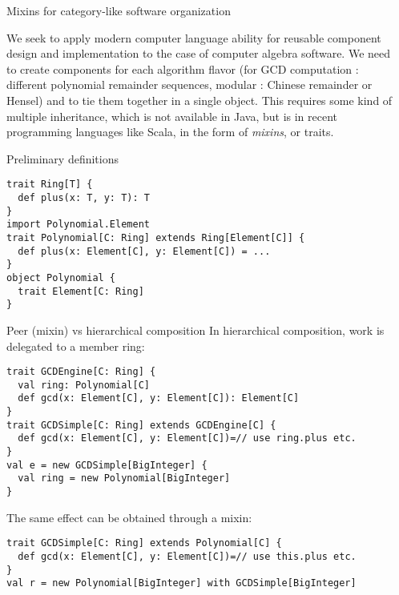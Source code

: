 \documentclass[final]{beamer}
\begin{document}
\begin{frame}[fragile]
\begin{columns}[t]
\begin{column}{.3\linewidth}
\end{column}

\begin{column}{.3\linewidth}
 
  \begin{block}{\large Mixins for category-like software organization}
{\footnotesize 
We seek to apply modern computer language ability for reusable
component design and implementation to the case of computer algebra
software. We need to create components for each algorithm flavor
(for GCD computation : different polynomial remainder sequences,
modular : Chinese remainder or Hensel) and to tie them together
in a single object. This requires some kind of multiple inheritance,
which is not available in Java, but is in recent programming
languages like Scala, in the form of {\em mixins}, or traits.
\par}\par
  \end{block}
  \hfill
  \begin{block}{\large Preliminary definitions}
\scriptsize
\begin{lstlisting}
trait Ring[T] {
  def plus(x: T, y: T): T
}
import Polynomial.Element
trait Polynomial[C: Ring] extends Ring[Element[C]] {
  def plus(x: Element[C], y: Element[C]) = ...
}
object Polynomial {
  trait Element[C: Ring]
}
\end{lstlisting}
  \end{block}
  \hfill
  \begin{block}{\large Peer (mixin) vs hierarchical composition}
\scriptsize
{\footnotesize In hierarchical composition, work is delegated to
a member ring:}\par
\begin{lstlisting}
trait GCDEngine[C: Ring] {
  val ring: Polynomial[C]
  def gcd(x: Element[C], y: Element[C]): Element[C]
}
trait GCDSimple[C: Ring] extends GCDEngine[C] {
  def gcd(x: Element[C], y: Element[C])=// use ring.plus etc.
}
val e = new GCDSimple[BigInteger] {
  val ring = new Polynomial[BigInteger]
}
\end{lstlisting}
{\footnotesize The same effect can be obtained through a mixin:}\par
\begin{lstlisting}
trait GCDSimple[C: Ring] extends Polynomial[C] {
  def gcd(x: Element[C], y: Element[C])=// use this.plus etc.
}
val r = new Polynomial[BigInteger] with GCDSimple[BigInteger]
\end{lstlisting}
  \end{block}

\end{column}

\end{columns}

\vfill
\end{frame}
\end{document}
